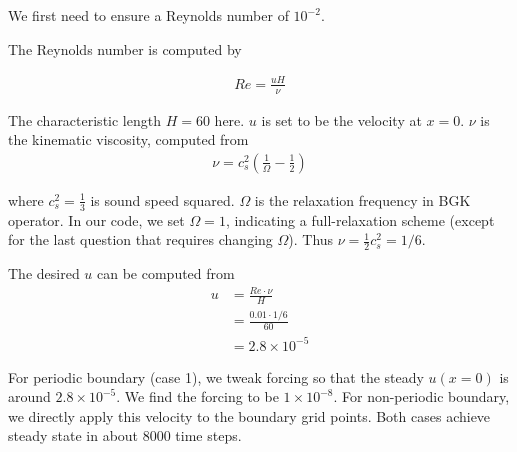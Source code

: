 \begin{solution} 

We first need to ensure a Reynolds number of $10^{-2}$.

The Reynolds number is computed by

    \begin{align*}
      Re = \frac{uH}{\nu}
    \end{align*}

The characteristic length $H = 60$ here. $u$ is set to be the velocity at $x=0$. $\nu$ is the kinematic viscosity, computed from 
    \begin{align*}
        \nu = c_s^2 (\frac{1}{\Omega} - \frac{1}{2})
    \end{align*}

where $c_s^2 = \frac{1}{3}$ is sound speed squared. $\Omega$ is the relaxation frequency in BGK operator. In our code, we set $\Omega = 1$, indicating a full-relaxation scheme (except for the last question that requires changing $\Omega$). Thus $\nu = \frac{1}{2} c_s^2 = 1/6$.

The desired $u$ can be computed from
    \begin{align*}
          u & = \frac{Re \cdot \nu}{H} \\
            & = \frac{0.01 \cdot 1/6}{60} \\
            & = 2.8 \times 10^{-5}
    \end{align*}

For periodic boundary (case 1), we tweak forcing so that the steady $u(x=0)$ is around  $2.8 \times 10^{-5}$. We find the forcing to be $1 \times 10^{-8}$. For non-periodic boundary, we directly apply this velocity to the boundary grid points. Both cases achieve steady state in about 8000 time steps.

\end{solution}